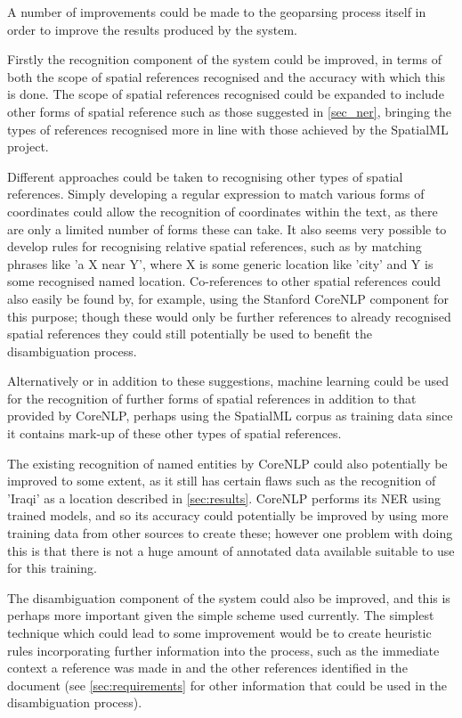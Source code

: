 \documentclass[12pt, a4paper]{report}
\begin{document}
A number of improvements could be made to the geoparsing process itself in order to improve the results produced by the system.

Firstly the recognition component of the system could be improved, in terms of both the scope of spatial references recognised and the accuracy with which this is done. The scope of spatial references recognised could be expanded to include other forms of spatial reference such as those suggested in \ref{sec_ner}, bringing the types of references recognised more in line with those achieved by the SpatialML project.

Different approaches could be taken to recognising other types of spatial references. Simply developing a regular expression to match various forms of coordinates could allow the recognition of coordinates within the text, as there are only a limited number of forms these can take. It also seems very possible to develop rules for recognising relative spatial references, such as by matching phrases like 'a X near Y', where X is some generic location like 'city' and Y is some recognised named location. Co-references to other spatial references could also easily be found by, for example, using the Stanford CoreNLP component for this purpose; though these would only be further references to already recognised spatial references they could still potentially be used to benefit the disambiguation process.

Alternatively or in addition to these suggestions, machine learning could be used for the recognition of further forms of spatial references in addition to that provided by CoreNLP, perhaps using the SpatialML corpus as training data since it contains mark-up of these other types of spatial references.

The existing recognition of named entities by CoreNLP could also potentially be improved to some extent, as it still has certain flaws such as the recognition of 'Iraqi' as a location described in \ref{sec:results}. CoreNLP performs its NER using trained models, and so its accuracy could potentially be improved by using more training data from other sources to create these; however one problem with doing this is that there is not a huge amount of annotated data available suitable to use for this training.

The disambiguation component of the system could also be improved, and this is perhaps more important given the simple scheme used currently. The simplest technique which could lead to some improvement would be to create heuristic rules incorporating further information into the process, such as the immediate context a reference was made in and the other references identified in the document (see \ref{sec:requirements} for other information that could be used in the disambiguation process).
\end{document}

